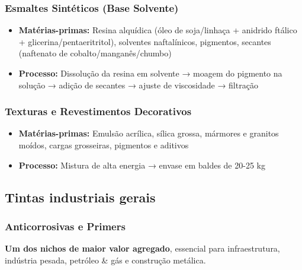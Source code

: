 \documentclass[
  12pt,
  a4paper,
  oneside,
  brazil,
  chapter=TITLE
]{article}
\begin{document}
\subsubsection{Esmaltes Sintéticos (Base
Solvente)}\label{esmaltes-sintuxe9ticos-base-solvente}

\begin{itemize}
\tightlist
\item
  \textbf{Matérias-primas:} Resina alquídica (óleo de soja/linhaça +
  anidrido ftálico + glicerina/pentaeritritol), solventes naftalínicos,
  pigmentos, secantes (naftenato de cobalto/manganês/chumbo)
\item
  \textbf{Processo:} Dissolução da resina em solvente → moagem do
  pigmento na solução → adição de secantes → ajuste de viscosidade →
  filtração
\end{itemize}

\subsubsection{Texturas e Revestimentos
Decorativos}\label{texturas-e-revestimentos-decorativos}

\begin{itemize}
\tightlist
\item
  \textbf{Matérias-primas:} Emulsão acrílica, sílica grossa, mármores e
  granitos moídos, cargas grosseiras, pigmentos e aditivos
\item
  \textbf{Processo:} Mistura de alta energia → envase em baldes de 20-25
  kg
\end{itemize}

\subsection{Tintas industriais
gerais}\label{tintas-industriais-gerais}

\subsubsection{Anticorrosivas e
Primers}\label{anticorrosivas-e-primers}

\textbf{Um dos nichos de maior valor agregado}, essencial para
infraestrutura, indústria pesada, petróleo \& gás e construção metálica.
\end{document}
